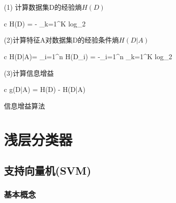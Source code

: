 


\begin{algorithm}[H]
\SetAlgoLined
{} \\
 \\
(1) 计算数据集D的经验熵$H(D)$ \\
\begin{array}{c}
\quad \quad H(D) = - \sum_{k=1}^{K} log_2
\end{array}

(2)计算特征A对数据集D的经验条件熵$H(D|A)$ \\
\begin{array}{c}
\quad \quad H(D|A)= \sum_{i=1}^{n} H(D_i) = -\sum_{i=1}^n  \sum_{k=1}^K log_2
\end{array}

(3)计算信息增益 \\
\begin{array}{c}
\quad \quad g(D|A) = H(D) - H(D|A)
\end{array}
\caption{信息增益算法}
\end{algorithm}

\section{浅层分类器}

\subsection{支持向量机(SVM)}

\subsubsection{基本概念}

